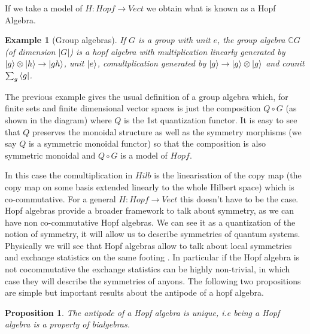 \documentclass{article}
\newtheorem{example}{Example}
\newtheorem{proposition}[theorem]{Proposition}
\begin{document}
If we take a model of $H:Hopf \rightarrow Vect$ we obtain what is known as a Hopf Algebra.
\begin{example}[Group algebras]
	If $G$ is a group with unit $e$, the group algebra $\mathbb{C}G$ (of dimension $|G|$) is a hopf algebra with multiplication linearly generated by $\ket{g}\otimes \ket{h} \rightarrow \ket{gh}$, unit $\ket{e}$, comultplication generated by $\ket{g} \rightarrow \ket{g} \otimes \ket{g}$ and counit $\sum_g \bra{g}$.
\end{example}
The previous example gives the usual definition of a group algebra which, for finite sets and finite dimensional vector spaces is just the composition $Q \circ G$ (as shown in the diagram) where $Q$ is the 1st quantization functor. It is easy to see that $Q$ preserves the monoidal structure as well as the symmetry morphisms (we say $Q$ is a symmetric monoidal functor) so that the composition is also symmetric monoidal and $Q \circ G$ is a model of $Hopf$.
\begin{center}
\end{center}
In this case the comultiplication in $Hilb$ is the linearisation of the copy map (the copy map on some basis extended linearly to the whole Hilbert space) which is co-commutative. For a general $H:Hopf \rightarrow Vect$ this doesn't have to be the case. Hopf algebras provide a broader framework to talk about symmetry, as we can have non co-commutative Hopf algebras. We can see it as a quantization of the notion of symmetry, it will allow us to describe symmetries of quantum systems. Physically we will see that Hopf algebras allow to talk about local symmetries and exchange statistics on the same footing \cite{Slingerland02}. In particular if the Hopf algebra is not cocommutative the exchange statistics can be highly non-trivial, in which case they will describe the symmetries of anyons.
The following two propositions are simple but important results about the antipode of a hopf algebra.
\begin{proposition}
	The antipode of a Hopf algebra is unique, i.e being a Hopf algebra is a property of bialgebras. 
\end{proposition}
\end{document}
